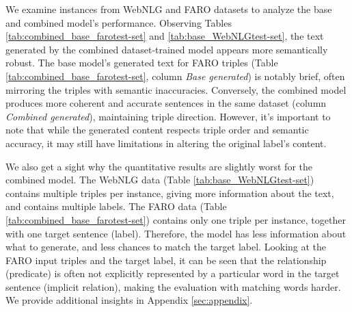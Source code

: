 \documentclass[
hf, %
]{ceurart}
\begin{document}
We examine instances from WebNLG and FARO datasets to analyze the base and combined model's performance. Observing Tables \ref{tab:combined_base_farotest-set} and \ref{tab:base_WebNLGtest-set}, the text generated by the combined dataset-trained model appears more semantically robust. The base model's generated text for FARO triples (Table \ref{tab:combined_base_farotest-set}, column \textit{Base generated}) is notably brief, often mirroring the triples with semantic inaccuracies. Conversely, the combined model produces more coherent and accurate sentences in the same dataset (column \textit{Combined generated}), maintaining triple direction. However, it's important to note that while the generated content respects triple order and semantic accuracy, it may still have limitations in altering the original label's content.

We also get a sight why the quantitative results are slightly worst for the combined model. The WebNLG data (Table \ref{tab:base_WebNLGtest-set}) contains multiple triples per instance, giving more information about the text, and contains multiple labels. The FARO data (Table \ref{tab:combined_base_farotest-set}) contains only one triple per instance, together with one target sentence (label). Therefore, the model has less information about what to generate, and less chances to match the target label. Looking at the FARO input triples and the target label, it can be seen that the relationship (predicate) is often not explicitly represented by a particular word in the target sentence (implicit relation), making the evaluation with matching words harder. We provide additional insights in Appendix \ref{sec:appendix}.
\end{document}
